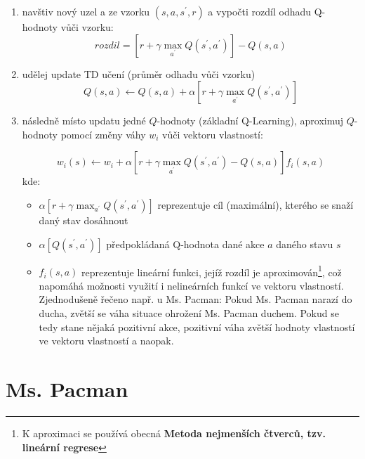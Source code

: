\begin{enumerate}

\item navštiv nový uzel a ze vzorku $(s,a,s^\prime,r)$ a vypočti rozdíl odhadu Q-hodnoty vůči vzorku:
\begin{displaymath}
 rozdil = \left [ r + \gamma \max_{a^\prime}Q(s^\prime,a^\prime) \right]  - Q(s,a) 
\end{displaymath}
\item udělej update TD učení (průměr odhadu vůči vzorku)
\begin{displaymath}
 Q(s,a) \leftarrow  Q(s,a) + \alpha \left [ r + \gamma \max_{a^\prime}Q(s^\prime,a^\prime) \right]
\end{displaymath}
\item následně místo updatu jedné $Q$-hodnoty (základní Q-Learning), aproximuj $Q$-hodnoty pomocí změny váhy $w_i$ vůči vektoru vlastností:

\begin{displaymath}
w_i(s) \leftarrow w_i + \alpha \left [ r + \gamma \max_{a^\prime}Q(s^\prime,a^\prime) - Q(s,a) \right] f_i(s,a)
\end{displaymath}
kde:
\begin{itemize}
	\item $\alpha \left [ r + \gamma \max_{a^\prime} Q(s^\prime,a^\prime)\right] $ reprezentuje cíl (maximální), kterého se snaží daný stav dosáhnout
	\item $\alpha \left [ Q(s^\prime,a^\prime)\right]$ předpokládaná Q-hodnota dané akce $a$ daného stavu $s$
	\item $f_i(s,a)$ reprezentuje lineární funkci, jejíž rozdíl je aproximován\footnote{K aproximaci se používá obecná \textbf{Metoda nejmenších čtverců, tzv. lineární regrese}}, což napomáhá možnosti využití i nelineárních funkcí ve vektoru vlastností. \newline
	Zjednodušeně řečeno např. u Ms. Pacman: Pokud Ms. Pacman narazí do ducha, zvětší se váha situace ohrožení Ms. Pacman duchem. Pokud se tedy stane nějaká pozitivní akce, pozitivní váha zvětší hodnoty vlastností ve vektoru vlastností a naopak.
\end{itemize}

\end{enumerate}

\chapter{Ms. Pacman}

